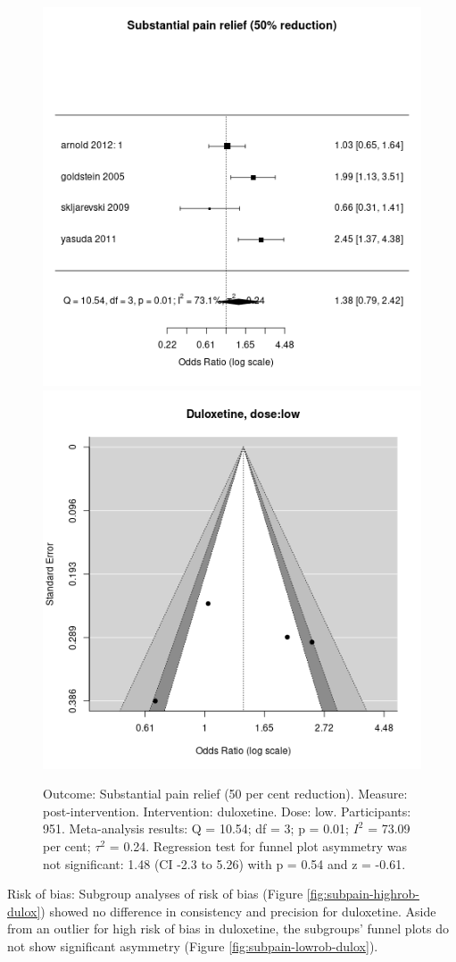 \documentclass{report}\usepackage[]{graphicx}\usepackage[]{color}
\newenvironment{knitrout}{}{} %
\begin{document}
\begin{figure}

\begin{knitrout}
\color{fgcolor}
\includegraphics[width=0.5\linewidth,height=0.35\textheight]{img/pain_sub-duloxetine-dose-low-forest} 
\includegraphics[width=0.5\linewidth,height=0.35\textheight]{img/pain_sub-duloxetine-dose-low-funnel} 
\end{knitrout}

\caption[Substantial pain: duloxetine, low dose]{Outcome: Substantial pain relief  (50 per cent reduction). Measure: post-intervention. Intervention: duloxetine. Dose: low. Participants: 951. Meta-analysis results: Q = 10.54; df = 3; p = 0.01; $I^2$ = 73.09 per cent; $\tau^2$ = 0.24. Regression test for funnel plot asymmetry was not significant: 1.48 (CI -2.3 to 5.26) with p = 0.54 and z = -0.61.
}
\label{fig:subpain-lowdose-dulox}
\end{figure}


Risk of bias: Subgroup analyses of risk of bias (Figure \ref{fig:subpain-highrob-dulox}) showed no difference in consistency and precision for duloxetine. Aside from an outlier for high risk of bias in duloxetine, the subgroups' funnel plots do not show significant asymmetry (Figure \ref{fig:subpain-lowrob-dulox}).
\end{document}
